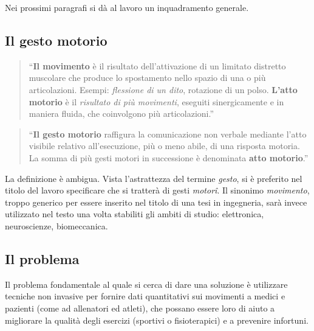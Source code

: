 Nei prossimi paragrafi si dà al lavoro un inquadramento generale.


	\subsection{Il gesto motorio} \label{ssez:definizione}

\begin{quotation}
	``\textbf{Il movimento} è il risultato dell'attivazione
	di un limitato distretto muscolare che produce lo spostamento nello spazio
	di una o più articolazioni.
	Esempi: \emph{flessione di un dito}, rotazione di un polso.
	\textbf{L'atto motorio} è il \emph{risultato di più movimenti},
	eseguiti sinergicamente e in maniera fluida, che coinvolgono più articolazioni.'' 
\cite{cit:mandolesi}
\end{quotation} 

\begin{quotation}
	``\textbf{Il gesto motorio} raffigura la comunicazione non verbale
	mediante l'atto visibile relativo all'esecuzione,
	più o meno abile, di una risposta motoria.
	La somma di più gesti motori in successione è denominata \textbf{atto motorio}.''
\cite{cit:lestini}
\end{quotation}

La definizione è ambigua.
Vista l'astrattezza del termine \emph{gesto},
si è preferito nel titolo del lavoro specificare che si tratterà di gesti \emph{motor\^i}.
Il sinonimo \emph{movimento},
troppo generico per essere inserito nel titolo di una tesi in ingegneria,
sarà invece utilizzato nel testo
una volta stabiliti gli ambiti di studio: elettronica, neuroscienze, biomeccanica.





	\subsection{Il problema}

Il problema fondamentale al quale si cerca di dare una soluzione
è utilizzare tecniche non invasive per fornire dati quantitativi sui movimenti
a medici e pazienti (come ad allenatori ed atleti),
che possano essere loro di aiuto a migliorare la qualità degli esercizi
(sportivi o fisioterapici)
e a prevenire infortuni.

